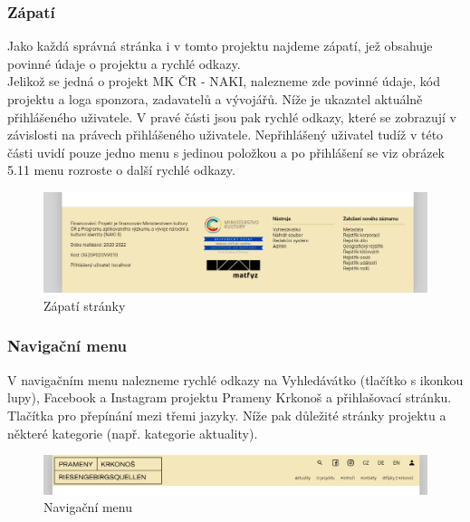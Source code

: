 \subsubsection{Zápatí}
Jako každá správná stránka i v tomto projektu najdeme zápatí, jež obsahuje povinné údaje o projektu a
rychlé odkazy.\\
Jelikož se jedná o projekt MK ČR - NAKI, nalezneme zde povinné údaje, kód projektu a
loga sponzora, zadavatelů a vývojářů.
Níže je ukazatel aktuálně přihlášeného uživatele.
V pravé části jsou pak rychlé odkazy, které se zobrazují v závislosti na právech přihlášeného uživatele.
Nepřihlášený uživatel tudíž v této části uvidí pouze jedno menu  s jedinou
položkou  a po přihlášení se viz obrázek 5.11 menu rozroste o další rychlé odkazy.
\begin{figure}[H]
	\centering
	\includegraphics[width=.8\linewidth]{img/zapati.png}
	\caption{Zápatí stránky}
\end{figure}

\subsubsection{Navigační menu}
V navigačním menu nalezneme rychlé odkazy na Vyhledávátko (tlačítko s ikonkou lupy),
Facebook a Instagram projektu Prameny Krkonoš a přihlašovací stránku. Tlačítka pro
přepínání mezi třemi jazyky. Níže pak důležité stránky projektu a některé kategorie
(např. kategorie aktuality).
\begin{figure}[H]
	\centering
	\includegraphics[width=.8\linewidth]{img/navigationBar.png}
	\caption{Navigační menu}
\end{figure}

